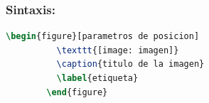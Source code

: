 \documentclass{book}
\begin{document}
\subsubsection*{Sintaxis:}
\begin{codigo}
\begin{center}
    \begin{lstlisting}[language=TeX]
        \begin{figure}[parametros de posicion]
          \texttt{[image: imagen]}
          \caption{titulo de la imagen}
          \label{etiqueta}              
        \end{figure}
    \end{lstlisting}
\end{center}
\caption{Sintaxis del entorno \texttt{figure}}
\label{sintaxis:figure}
\end{codigo}
\end{document}
